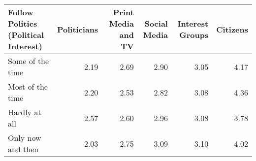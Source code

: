 \begin{tabular}{lrrrrr}
  \toprule
Follow Politics (Political Interest) & Politicians & Print Media and TV & Social Media & Interest Groups & Citizens \\ 
  \midrule
Some of the time & 2.19 & 2.69 & 2.90 & 3.05 & 4.17 \\ 
  Most of the time & 2.20 & 2.53 & 2.82 & 3.08 & 4.36 \\ 
  Hardly at all & 2.57 & 2.60 & 2.96 & 3.08 & 3.78 \\ 
  Only now and then & 2.03 & 2.75 & 3.09 & 3.10 & 4.02 \\ 
   \bottomrule
\end{tabular}
